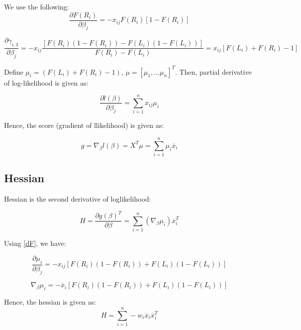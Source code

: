 \documentclass[12pt,a4paper]{report}
\begin{document}
We use the following:
\begin{equation} \label{dF}
\frac{\partial F(R_i)}{\partial \beta_j} =  -x_{ij} F(R_i)[1-F(R_i)]
\end{equation}

\begin{equation}
\frac{\partial \gamma_{i,3}}{\partial \beta_j} = - x_{ij} \frac{ [F(R_i) (1-F(R_i)) - F(L_i)(1-F(L_i))] }{F(R_i) - F(L_i)} = x_{ij} [F(L_i) + F(R_i) - 1]
\end{equation}

Define $\mu_i = (F(L_i) + F(R_i) - 1)$, $\mu = [\mu_1, ... \mu_n]^T$. Then, partial derivative of log-likelihood is given as:

\begin{equation}
\frac{\partial l(\beta)}{\partial \beta_j} = \sum_{i=1}^n x_{ij} \mu_i
\end{equation}

Hence, the score (gradient of llikelihood) is given as:

\begin{equation}
g = \nabla_{\beta} l(\beta) = X^T \mu = \sum_{i=1}^n \mu_i \overline x_i
\end{equation}

\subsection{Hessian}
Hessian is the second derivative of loglikelihood:

\begin{equation}
H = \frac{ \partial {g(\beta)}^T}{\partial \beta} = \sum_{i=1}^n (\nabla_{\beta} \mu_i) \overline x_i^T
\end{equation}

Using \ref{dF}, we have:

\begin{equation}
\frac{ \partial \mu_i}{\partial \beta_j} = -x_{ij} [F(R_i) (1-F(R_i)) +  F(L_i) (1-F(L_i))]
\end{equation}

\begin{equation}
\nabla_{\beta} \mu_i = -\overline x_i [F(R_i) (1-F(R_i)) + F(L_i) (1-F(L_i))]
\end{equation}

Hence, the hessian is given as:
\begin{equation}
H = \sum_{i=1}^n -w_i \overline x_i \overline x_i^T
\end{equation}
\end{document}
